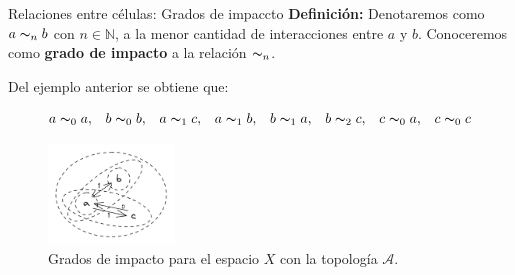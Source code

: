 \documentclass[9pt]{beamer}
\begin{document}
\begin{frame}{Relaciones entre células: Grados de impaccto}
\textbf{Definición:} Denotaremos como $a\thicksim_n b$ con $n\in\mathbb{N}$, a la menor cantidad de interacciones entre $a$ y $b$. Conoceremos como \textbf{grado de impacto} a la relación $\thicksim_n$.

Del ejemplo anterior se obtiene que:

$$\begin{array}{cccccccc}
    a\thicksim_0 a, & b\thicksim_0 b, & a\thicksim_1 c, & a\thicksim_1 b, &
    b\thicksim_1 a, & b\thicksim_2 c, & c\thicksim_0 a, & c\thicksim_0 c
\end{array}$$
\begin{figure}[h]
  \centering
    \includegraphics[width=0.3\textwidth]{Imagenes/grados_de_impacto.PNG}
  \caption{Grados de impacto para el espacio $X$ con la topología $\mathcal{A}$.}
  \label{fig:gradoImpacto}
\end{figure}
\end{frame}
\end{document}
